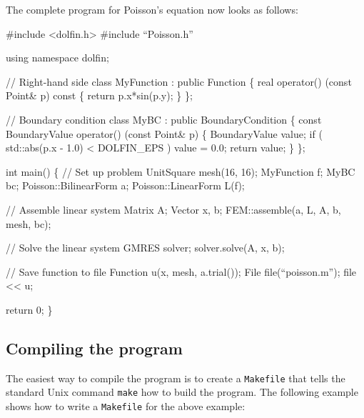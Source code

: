 The complete program for Poisson's equation now looks as follows:
\footnotesize
\begin{code}
  #include <dolfin.h>
  #include ``Poisson.h''
  
  using namespace dolfin;

  // Right-hand side
  class MyFunction : public Function
  \{
    real operator() (const Point& p) const
    \{
      return p.x*sin(p.y);
    \}
  \};

  // Boundary condition
  class MyBC : public BoundaryCondition
  \{
    const BoundaryValue operator() (const Point& p)
    \{
      BoundaryValue value;
      if ( std::abs(p.x - 1.0) < DOLFIN_EPS )
        value = 0.0;
      return value;
    \}
  \};

  int main()
  \{
    // Set up problem
    UnitSquare mesh(16, 16);
    MyFunction f;
    MyBC bc;
    Poisson::BilinearForm a;
    Poisson::LinearForm L(f);

    // Assemble linear system
    Matrix A;
    Vector x, b;
    FEM::assemble(a, L, A, b, mesh, bc);

    // Solve the linear system
    GMRES solver;
    solver.solve(A, x, b);
    
    // Save function to file
    Function u(x, mesh, a.trial());
    File file(``poisson.m'');
    file << u;

    return 0;
  \}
\end{code}
\normalsize

\subsection{Compiling the program}

The easiest way to compile the program is to create a
\texttt{Makefile} that tells the standard Unix command \texttt{make}
how to build the program. The following example shows how to write a
\texttt{Makefile} for the above example:
\footnotesize
{}
\normalsize

